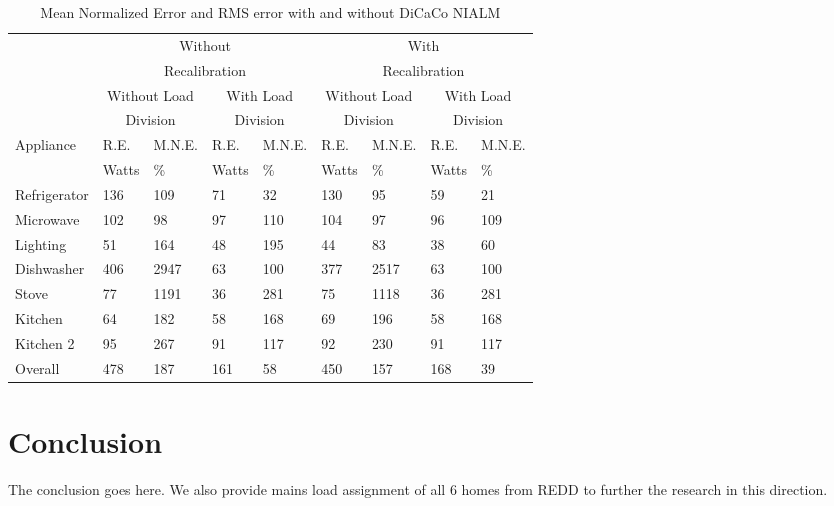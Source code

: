 \documentclass[conference]{IEEEtran}
\begin{document}
\begin{table}
\caption{Mean Normalized Error and RMS error with and without DiCaCo NIALM}
\label{tab:results}
\begin{tabular}{|p{30pt}|p{12pt}|p{14pt}|p{12pt}|p{14pt}|p{12pt}|p{14pt}|p{12pt}|p{14pt}|}
\hline
&\multicolumn{4}{|c|}{Without}&\multicolumn{4}{|c|}{With}\\
&\multicolumn{4}{|c|}{Recalibration}&\multicolumn{4}{|c|}{Recalibration}\\
\hline
&\multicolumn{2}{|c|}{Without Load}&\multicolumn{2}{|c|}{With Load}&\multicolumn{2}{|c|}{Without Load}&\multicolumn{2}{|c|}{With Load}\\
&\multicolumn{2}{|c|}{Division}&\multicolumn{2}{|c|}{Division}&\multicolumn{2}{|c|}{Division}&\multicolumn{2}{|c|}{Division}\\
\hline

Appliance &R.E.&M.N.E.& R.E.&M.N.E.&R.E.&M.N.E.&R.E.& M.N.E.\\
&Watts&\%&Watts&\%&Watts&\%&Watts&\%\\
\hline
Refrigerator & 136 &109 & 71 & 32 & 130 &95  &59 &21\\
Microwave    & 102 &98  & 97 & 110& 104 &97  &96 &109\\
Lighting     & 51  &164 & 48 & 195& 44  &83  &38 &60\\
Dishwasher   & 406 &2947& 63 & 100& 377 &2517&63 &100\\
Stove        & 77  &1191& 36 & 281& 75  &1118&36 &281\\
Kitchen      & 64  &182 & 58 & 168& 69  &196 &58 &168\\
Kitchen 2    & 95  &267 & 91 & 117& 92  &230 &91 &117\\
\hline
Overall      &478  &187 &161 &  58& 450 &157 &168&39\\

\hline

\end{tabular}
\end{table}





\section{Conclusion}
The conclusion goes here.
We also provide mains load assignment of all 6 homes from REDD to further the research in this direction.
\end{document}
